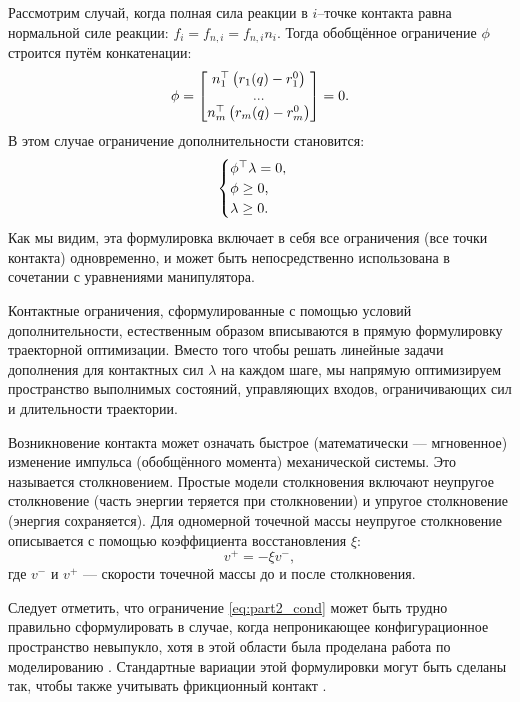 Рассмотрим случай, когда полная сила реакции в $i$--точке контакта равна нормальной силе реакции: ${f}_i = {f}_{n,i} = f_{n,i} {n}_i$. Тогда обобщённое ограничение $\phi$ строится путём конкатенации:
%
\begin{align}
	\phi = \begin{bmatrix}
		{n}_1^\top \left({r}_1({q}) - {r}_1^0 \right) \\
		... \\
		{n}_m^\top \left({r}_m({q}) - {r}_m^0 \right)
	\end{bmatrix}
	= 0.
\end{align}
%
В этом случае ограничение дополнительности становится:
%
\begin{align}
	\begin{cases}
		\phi^\top \lambda = 0, \\
		\phi \geq 0, \\
		\lambda \geq 0.
	\end{cases}
\end{align}
%
Как мы видим, эта формулировка включает в себя все ограничения (все точки контакта) одновременно, и может быть непосредственно использована в сочетании с уравнениями манипулятора.

Контактные ограничения, сформулированные с помощью условий дополнительности, естественным образом вписываются в прямую формулировку траекторной оптимизации. Вместо того чтобы решать линейные задачи дополнения для контактных сил $\lambda$ на каждом шаге, мы напрямую оптимизируем пространство выполнимых состояний, управляющих входов, ограничивающих сил и длительности траектории. 

Возникновение контакта может означать быстрое (математически --- мгновенное) изменение импульса (обобщённого момента) механической системы. Это называется столкновением.
%
Простые модели столкновения включают неупругое столкновение (часть энергии теряется при столкновении) и упругое столкновение (энергия сохраняется).
%
Для одномерной точечной массы неупругое столкновение описывается с помощью коэффициента восстановления $\xi$:
%
\begin{equation}
	v^+ = -\xi v^-,
\end{equation}
%
где $v^-$ и $v^+$ --- скорости точечной массы до и после столкновения.

Следует отметить, что ограничение \eqref{eq:part2_cond} может быть трудно правильно сформулировать в случае, когда непроникающее конфигурационное пространство невыпукло, хотя в этой области была проделана работа по моделированию \cite{Nguyen2010}. Стандартные вариации этой формулировки могут быть сделаны так, чтобы также учитывать фрикционный контакт \cite{Tassa2012, brogliato2012nonsmooth}.

